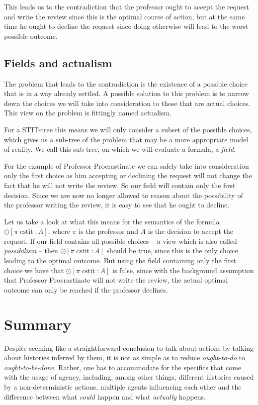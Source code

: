 \documentclass{article}
\newcommand{\cstit}{\operatorname{cstit}}
\begin{document}
This leads us to the contradiction that the professor ought to accept the request and write the review since this is the optimal course of action, but at the same time he ought to decline the request since doing otherwise will lead to the worst possible outcome.

\subsection{Fields and actualism}
The problem that leads to the contradiction is the existence of a possible choice that is in a way already settled. A possible solution to this problem is to narrow down the choices we will take into consideration to those that are actual choices. This view on the problem is fittingly named actualism.

For a STIT-tree this means we will only consider a subset of the possible choices, which gives us a sub-tree of the problem that may be a more appropriate model of reality. We call this sub-tree, on which we will evaluate a formula, a \emph{field}.

For the example of Professor Procrastinate we can safely take into consideration only the first choice as him accepting or declining the request will not change the fact that he will not write the review. So our field will contain only the first decision. Since we are now no longer allowed to reason about the possibility of the professor writing the review, it is easy to see that he ought to decline.

Let us take a look at what this means for the semantics of the formula $\odot [\pi \cstit \colon A]$, where $\pi$ is the professor and $A$ is the decision to accept the request. If our field contains all possible choices -- a view which is also called \emph{possibilism} -- then $\odot [\pi \cstit \colon A]$ should be true, since this is the only choice leading to the optimal outcome. But using the field containing only the first choice we have that $\odot [\pi \cstit \colon A]$ is false, since with the background assumption that Professor Procrastinate will not write the review, the actual optimal outcome can only be reached if the professor declines.

\section{Summary}
Despite seeming like a straightforward conclusion to talk about actions by talking about histories inferred by them, it is not as simple as to reduce \emph{ought-to-do} to \emph{ought-to-be-done}. Rather, one has to accommodate for the specifics that come with the usage of agency, including, among other things, different histories caused by a non-deterministic actions, multiple agents influencing each other and the difference between what \emph{could} happen and what \emph{actually} happens.



\nocite{*}

\end{document}
